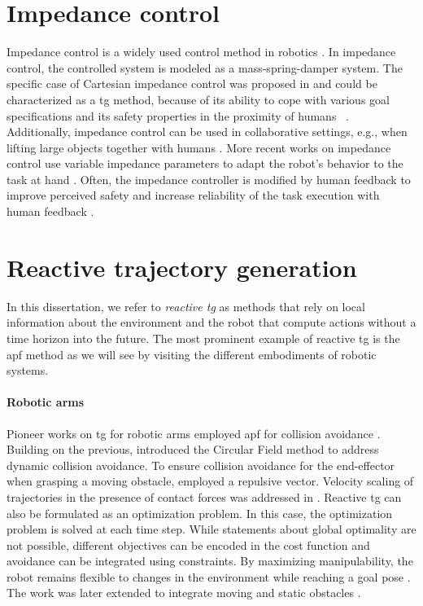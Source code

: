 \section{Impedance control}%
\label{sec:impedance_control}

Impedance control is a widely used control method in
robotics \cite{hogan1985impedance,abu2020variable}. In impedance
control, the controlled system is modeled as a
mass-spring-damper system. The specific case of Cartesian
impedance control was proposed in \cite{albu2002cartesian} and
could be characterized as a \ac{tg} method, because of
its ability to cope with various goal specifications and its
safety properties in the proximity of humans
~\cite{van2022disagreement,hjorth2024enabling}.
Additionally, impedance control can be used in collaborative
settings, e.g., when lifting large objects together with
humans \cite{abu2020variable}. More recent works on
impedance control use variable impedance parameters to adapt
the robot's behavior to the task at hand
\cite{abu2020variable}. Often, the impedance controller is
modified by human feedback to improve perceived safety and
increase reliability of the task execution with human
feedback \cite{lachner2022shaping,franzese2021ilosa}.

\section{Reactive trajectory generation}%
\label{sec:reactive_trajectory_generation}

In this dissertation, we refer to \textit{reactive \ac{tg}}
as methods that rely on local information about the
environment and the robot that compute actions without a
time horizon into the future. The most prominent example of
reactive \ac{tg} is the \acf{apf} method as we will
see by visiting the different embodiments of robotic
systems.

\paragraph{Robotic arms}

Pioneer works on \ac{tg} for robotic arms
employed \ac{apf} for collision avoidance
\cite{Khatib1985,khatib1986real,park2008movement}. Building
on the previous, \cite{Haddadin2011} introduced the Circular
Field method to address dynamic collision avoidance. To
ensure collision avoidance for the end-effector when
grasping a moving obstacle, \cite{Du2018} employed a
repulsive vector.
Velocity scaling of trajectories in the presence of 
contact forces was addressed in \cite{haddadin2010real}.
Reactive \ac{tg} can also be formulated as an optimization
problem. In this case, the optimization problem is solved
at each time step. While statements about global optimality
are not possible, different objectives can be encoded in the
cost function and avoidance can be integrated using
constraints. By maximizing manipulability, the robot remains
flexible to changes in the environment while reaching a goal
pose \cite{haviland2020purely}. The work was later extended
to integrate moving and static obstacles
\cite{haviland2021neo}.

